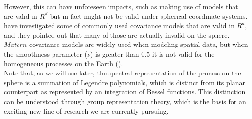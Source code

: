 However, this can have unforeseen impacts, such as making use of models that are valid in $R^d$ but in fact might not be valid under spherical coordinate systems. \cite{HuangZhangRobeson2011} have investigated some of commonly used covariance models that are valid in $R^d$, and they pointed out that many of those are actually invalid on the sphere. $Mat\acute{e}rn$ covariance models are widely used when modeling spatial data, but when the smoothness parameter ($\nu$) is greater than 0.5 it is not valid for the homogeneous processes on the Earth (\cite{Gneiting2013}). \\

Note that, as we will see later, the spectral representation of the process on the sphere is a summation of Legendre polynomials, which is distinct from its planar counterpart as represented by an integration of Bessel functions. This distinction can be understood through group representation theory, which is the basis for an exciting new line of research we are currently pursuing.\\




